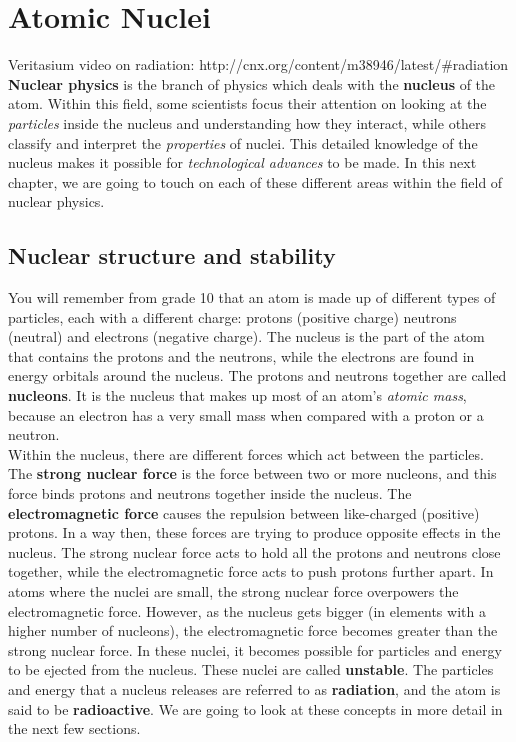 \chapter{Atomic Nuclei}
\label{chap:an}
Veritasium video on radiation: http://cnx.org/content/m38946/latest/#radiation
\textbf{Nuclear physics} is the branch of physics which deals with the \textbf{nucleus} of the atom. Within this field, some scientists focus their attention on looking at the \textit{particles} inside the nucleus and understanding how they interact, while others classify and interpret the \textit{properties} of nuclei. This detailed knowledge of the nucleus makes it possible for \textit{technological advances} to be made. In this next chapter, we are going to touch on each of these different areas within the field of nuclear physics.



\section{Nuclear structure and stability}
\label{sec:an:ns}

You will remember from grade 10 that an atom is made up of different types of particles, each with a different charge: protons (positive charge) neutrons (neutral) and electrons (negative charge). The nucleus is the part of the atom that contains the protons and the neutrons, while the electrons are found in energy orbitals around the nucleus. The protons and neutrons together are called \textbf{nucleons}. It is the nucleus that makes up most of an atom's \textit{atomic mass}, because an electron has a very small mass when compared with a proton or a neutron.\\

Within the nucleus, there are different forces which act between the particles. The \textbf{strong nuclear force} is the force between two or more nucleons, and this force binds protons and neutrons together inside the nucleus. The \textbf{electromagnetic force} causes the repulsion between like-charged (positive) protons. In a way then, these forces are trying to produce opposite effects in the nucleus. The strong nuclear force acts to hold all the protons and neutrons close together, while the electromagnetic force acts to push protons further apart. In atoms where the nuclei are small, the strong nuclear force overpowers the electromagnetic force. However, as the nucleus gets bigger (in elements with a higher number of nucleons), the electromagnetic force becomes greater than the strong nuclear force. In these nuclei, it becomes possible for particles and energy to be ejected from the nucleus. These nuclei are called \textbf{unstable}. The particles and energy that a nucleus releases are referred to as \textbf{radiation}, and the atom is said to be \textbf{radioactive}. We are going to look at these concepts in more detail in the next few sections.



